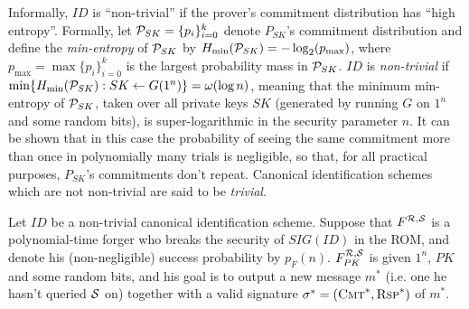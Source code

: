 Informally, $ID$ is ``non-trivial'' if the prover's commitment distribution
has ``high entropy''. Formally, let $\mathcal{P}_{SK} = \{p_i\}_{i=0}^k$ denote
$P_{SK}$'s commitment distribution and define the {\it min-entropy} of
$\mathcal{P}_{SK}$ by $H_{\min}(\mathcal{P}_{SK}) = -\log_2(p_{\max})$, where
$p_{\max} = \max\{p_i\}_{i=0}^k$ is the largest probability mass in
$\mathcal{P}_{SK}$.  $ID$ is {\it non-trivial} if $\min\{H_{\min}(\mathcal{P}_{SK}) : SK
\gets G(1^n)\} = \omega(\log n)$, meaning that the minimum min-entropy of
$\mathcal{P}_{SK}$, taken over all private keys $SK$ (generated by running $G$ on
$1^n$ and some random bits), is super-logarithmic in the security parameter
$n$. It can be shown that in this case the probability of seeing the same
commitment more than once in polynomially many trials is negligible, so that,
for all practical purposes, $P_{SK}$'s commitments don't repeat. Canonical
identification schemes which are not non-trivial are said to be {\it trivial}.

Let $ID$ be a non-trivial canonical identification scheme. Suppose that
$F^{\mathcal{R},\mathcal{S}}$ is a polynomial-time forger who breaks the security of
$SIG(ID)$ in the ROM, and denote his (non-negligible) success probability by
$p_F(n)$.  $F^{\mathcal{R},\mathcal{S}}_{PK}$ is given $1^n$, $PK$ and some random bits,
and his goal is to output a new message $m^*$ (i.e. one he hasn't
queried $\mathcal{S}$ on) together with a valid signature $\sigma^* =
(\textsc{Cmt}^*,\textsc{Rsp}^*)$ of $m^*$.

